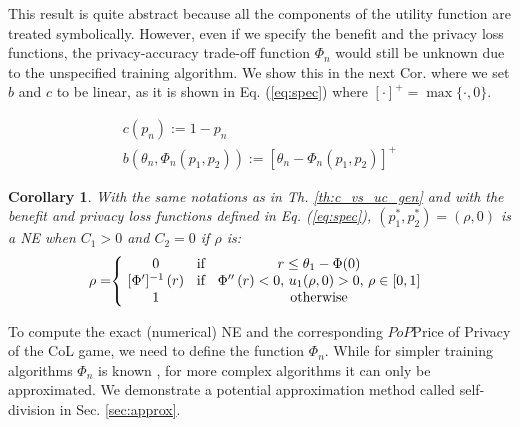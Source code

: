 \documentclass[USenglish,oneside,twocolumn]{article}
\theoremstyle{plain}
\newtheorem*{corollary}{Corollary}
\begin{document}
    This result is quite abstract because all the components of the utility function are treated symbolically. However, even if we specify the benefit and the privacy loss functions, the privacy-accuracy trade-off function $\Phi_n$ would still be unknown due to the unspecified training algorithm. We show this in the next Cor. where we set $b$ and $c$ to be linear, as it is shown in Eq. (\ref{eq:spec}) where $[\cdot]^+=\max\{\cdot,0\}$.
    
    \vspace{-0.1cm}
    \begin{equation}
    \label{eq:spec}
    \begin{gathered}
    c(p_n):=1-p_n\\
    b(\theta_n,\Phi_n(p_1,p_2)):=[\theta_n-\Phi_n(p_1,p_2)]^+
    \end{gathered}
    \end{equation}
    
    \vspace{-0.25cm}
    \begin{corollary}
        With the same notations as in Th. \ref{th:c_vs_uc_gen} and with the benefit and privacy loss functions defined in Eq. (\ref{eq:spec}), $(p_1^*,p_2^*)=(\rho,0)$ is a NE when $C_1>0$ and $C_2=0$ if $\rho$ is:
        \vspace{-0.25cm}
        \begin{equation*}
        \rho=\hspace{-0.1cm}\left\{\hspace{-0.1cm}
        \begin{tabular}{ccc}
        $0$ & \hspace{-0.1cm}if\hspace{-0.1cm} & $r\leq\theta_1-\Phi(0)$\\
        $[\Phi']^{-1}\left(r\right)$ & \hspace{-0.1cm}if\hspace{-0.1cm} & $\Phi''\left(r\right)<0$, $u_1(\rho,0)>0$, $\rho\in[0,1]$\\
        $1$ & \hspace{-0.2cm} & otherwise \\
        \end{tabular}\right.
        \end{equation*}
    \end{corollary}
    \vspace{-0.25cm}
    
    To compute the exact (numerical) NE and the corresponding \textit{$PoP$}Price of Privacy of the CoL game, we need to define the function $\Phi_n$. While for simpler training algorithms $\Phi_n$ is known \cite{ioannidis2013linear,chessa2015game}, for more complex algorithms it can only be approximated. We demonstrate a potential approximation method called self-division in Sec. \ref{sec:approx}.
    
\end{document}
